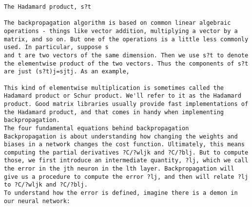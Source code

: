 \begin{lstlisting}
The Hadamard product, s?t

The backpropagation algorithm is based on common linear algebraic operations - things like vector addition, multiplying a vector by a matrix, and so on. But one of the operations is a little less commonly used. In particular, suppose s
and t are two vectors of the same dimension. Then we use s?t to denote the elementwise product of the two vectors. Thus the components of s?t are just (s?t)j=sjtj. As an example, 

This kind of elementwise multiplication is sometimes called the Hadamard product or Schur product. We'll refer to it as the Hadamard product. Good matrix libraries usually provide fast implementations of the Hadamard product, and that comes in handy when implementing backpropagation.
The four fundamental equations behind backpropagation
Backpropagation is about understanding how changing the weights and biases in a network changes the cost function. Ultimately, this means computing the partial derivatives ?C/?wljk and ?C/?blj. But to compute those, we first introduce an intermediate quantity, ?lj, which we call the error in the jth neuron in the lth layer. Backpropagation will give us a procedure to compute the error ?lj, and then will relate ?lj to ?C/?wljk and ?C/?blj.
To understand how the error is defined, imagine there is a demon in our neural network: 


\end{lstlisting}
